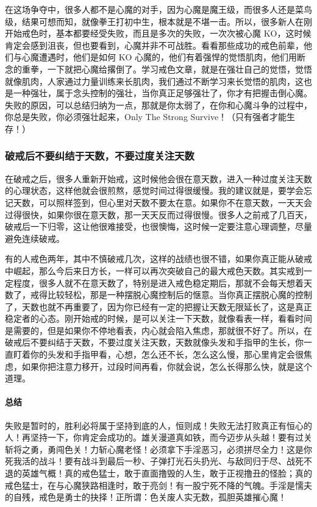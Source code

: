 在这场争夺中，很多人都不是心魔的对手，因为心魔是魔王级，而很多人还是菜鸟级，结果可想而知，就像拳王打初中生，根本就是不堪一击。所以，很多新人在刚开始戒色时，基本都要经受失败，而且是多次的失败，一次次被心魔 KO，这时候肯定会感到沮丧，但也要看到，心魔并非不可战胜。看看那些成功的戒色前辈，他们与心魔遭遇时，他们是如何 KO 心魔的，他们有着强悍的觉悟肌肉，他们用断念的重拳，一下就把心魔给撂倒了。学习戒色文章，就是在强壮自己的觉悟，觉悟就像肌肉，人家通过力量训练来长肌肉，我们通过不断学习来长觉悟的肌肉，这也是一种强壮，属于念头控制的强壮，当你真正足够强壮了，你才有把握击倒心魔。失败的原因，可以总结归纳为一点，那就是你太弱了，在你和心魔斗争的过程中，你总是失败，你必须强壮起来，Only The Strong Survive！（只有强者才能生存！）

\subsubsection{破戒后不要纠结于天数，不要过度关注天数}

在破戒之后，很多人重新开始戒，这时候他会很在意天数，进入一种过度关注天数的心理状态，这样他就会很煎熬，感觉时间过得很缓慢。我的建议就是，要学会忘记天数，可以照样签到，但心里对天数不要太在意。如果你不在意天数，一天天会过得很快，如果你很在意天数，那一天天反而过得很慢。很多人之前戒了几百天，破戒后一下归零，这让他很难接受，也很懊悔，这时候一定要注意心理调整，尽量避免连续破戒。

有的人戒色两年，其中不慎破戒几次，这样的战绩也很不错，如果你真正能从破戒中崛起，那么今后来日方长，一样可以再次突破自己的最大戒色天数。其实戒到一定程度，很多人就不在意天数了，特别是进入戒色稳定期后，那就不会每天想着天数了，戒得比较轻松，那是一种摆脱心魔控制后的惬意。当你真正摆脱心魔的控制了，天数也就不再重要了，因为你已经有一定的把握让天数无限延长了，这是真正稳定者的心态。刚开始戒的时候，是可以关注一下天数，就像看表一样，看看时间是需要的，但是如果你不停地看表，内心就会陷入焦虑，那就很不好了。所以，在破戒后不要纠结于天数，不要过度关注天数，天数就像头发和手指甲的生长，你一直盯着你的头发和手指甲看，心想，怎么还不长，怎么这么慢，那心里肯定会很焦虑，如果你把注意力移开，过段时间再看，你就会说，怎么长得那么快，就是这个道理。

\paragraph*{总结}

失败是暂时的，胜利必将属于坚持到底的人，恒则成！失败无法打败真正有恒心的人！再坚持一下，你肯定会成功的。雄关漫道真如铁，而今迈步从头越！要有过关斩将之勇，勇闯色关！力斩心魔老怪！必须拿下手淫恶习，必须拼尽全力！这是你死我活的战斗！要有战斗到最后一秒、子弹打光石头扔光、与敌同归于尽、战死不退的英雄气概！真的戒色猛士，敢于直面撸毁的人生，敢于正视撸丑的怪脸；真的戒色猛士，在与心魔狭路相逢时，敢于亮剑！有一股宁死不降的气魄。手淫是懦夫的自残，戒色是勇士的抉择！正所谓：色关废人实无数，孤胆英雄摧心魔！

